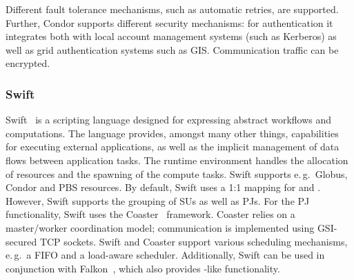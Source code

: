 \documentclass{sig-alternate}
\begin{document}
Different fault tolerance mechanisms, such as automatic retries, are
supported.  Further, Condor supports different security mechanisms:
for authentication it integrates both with local account management
systems (such as Kerberos) as well as grid authentication systems such
as GIS. Communication traffic can be encrypted.

\subsubsection{Swift}
Swift~\cite{Wilde2011} is a scripting language designed for expressing
abstract workflows and computations. The language provides, amongst many other
things, capabilities for executing external applications, as well as the
implicit management of data flows between application tasks. 
The runtime environment handles the allocation of resources and the spawning of 
the compute tasks. 
Swift supports e.\,g.\ Globus, Condor and PBS resources. 
By default, Swift uses a 1:1 mapping for \cus and \sus. However,
Swift supports the grouping of SUs as well as PJs. For the PJ functionality, Swift uses the
Coaster~\cite{coasters} framework. Coaster relies on a master/worker
coordination model; communication is implemented using GSI-secured TCP sockets.
Swift and Coaster support various scheduling mechanisms, e.\,g.\ a FIFO and a
load-aware scheduler. Additionally, Swift can be used in conjunction with 
Falkon~\cite{1362680}, which also provides \pilot-like functionality.

\end{document}
